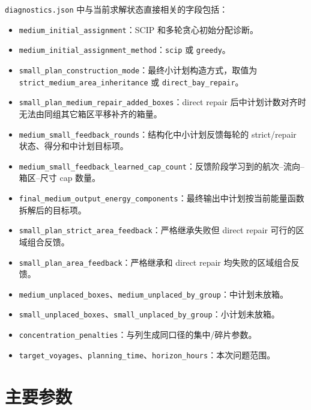 \documentclass[UTF8,a4paper,11pt]{ctexart}
\newcommand{\code}[1]{\nolinkurl{#1}}
\begin{document}
\code{diagnostics.json} 中与当前求解状态直接相关的字段包括：
\begin{itemize}
  \item \code{medium_initial_assignment}：SCIP 和多轮贪心初始分配诊断。
  \item \code{medium_initial_assignment_method}：\code{scip} 或 \code{greedy}。
  \item \code{small_plan_construction_mode}：最终小计划构造方式，取值为 \code{strict_medium_area_inheritance} 或 \code{direct_bay_repair}。
  \item \code{small_plan_medium_repair_added_boxes}：direct repair 后中计划计数对齐时无法由同组其它箱区平移补齐的箱量。
  \item \code{medium_small_feedback_rounds}：结构化中小计划反馈每轮的 strict/repair 状态、得分和中计划目标项。
  \item \code{medium_small_feedback_learned_cap_count}：反馈阶段学习到的航次--流向--箱区--尺寸 cap 数量。
  \item \code{final_medium_output_energy_components}：最终输出中计划按当前能量函数拆解后的目标项。
  \item \code{small_plan_strict_area_feedback}：严格继承失败但 direct repair 可行的区域组合反馈。
  \item \code{small_plan_area_feedback}：严格继承和 direct repair 均失败的区域组合反馈。
  \item \code{medium_unplaced_boxes}、\code{medium_unplaced_by_group}：中计划未放箱。
  \item \code{small_unplaced_boxes}、\code{small_unplaced_by_group}：小计划未放箱。
  \item \code{concentration_penalties}：与列生成同口径的集中/碎片参数。
  \item \code{target_voyages}、\code{planning_time}、\code{horizon_hours}：本次问题范围。
\end{itemize}

\section{主要参数}
\end{document}
